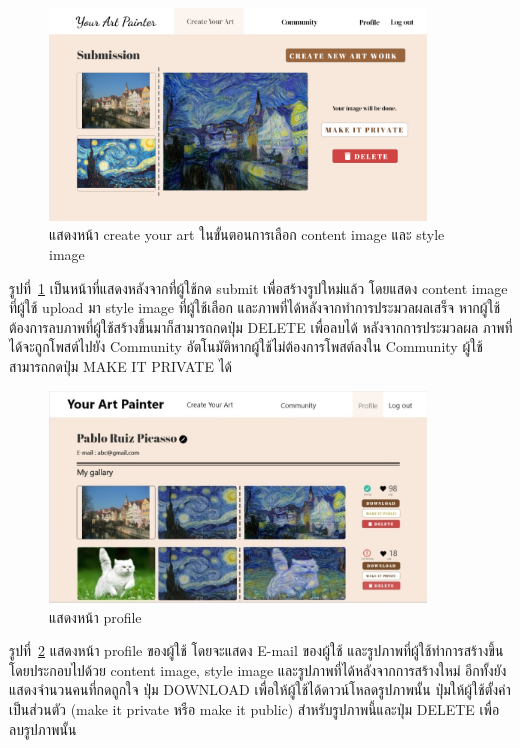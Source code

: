 \documentclass[12pt,oneside,openright,a4paper]{cpe-thai-project}
\begin{document}
\newpage
\begin{figure}[!h]
  \centering
  \includegraphics[width=10cm]{./image/ui-create2.png}
  \caption{แสดงหน้า create your art ในขั้นตอนการเลือก content image และ style image}
  \label{fig:ui-create2}
\end{figure}
\par\setlength{\parindent}{5ex}
รูปที่~\ref{fig:ui-create2} เป็นหน้าที่แสดงหลังจากที่ผู้ใช้กด submit เพื่อสร้างรูปใหม่แล้ว โดยแสดง content image ที่ผู้ใช้ upload มา style image ที่ผู้ใช้เลือก และภาพที่ได้หลังจากทำการประมวลผลเสร็จ หากผู้ใช้ต้องการลบภาพที่ผู้ใช้สร้างขึ้นมาก็สามารถกดปุ่ม DELETE เพื่อลบได้ หลังจากการประมวลผล ภาพที่ได้จะถูกโพสต์ไปยัง Community อัตโนมัติหากผู้ใช้ไม่ต้องการโพสต์ลงใน Community ผู้ใช้สามารถกดปุ่ม MAKE IT PRIVATE ได้

\begin{figure}[!h]
  \centering
  \includegraphics[width=10cm]{./image/ui-profile.jpg}
  \caption{แสดงหน้า profile}
  \label{fig:ui-profile}
\end{figure}

\par\setlength{\parindent}{5ex}
รูปที่~\ref{fig:ui-profile} แสดงหน้า profile ของผู้ใช้ โดยจะแสดง E-mail ของผู้ใช้ และรูปภาพที่ผู้ใช้ทำการสร้างขึ้น โดยประกอบไปด้วย content image, style image และรูปภาพที่ได้หลังจากการสร้างใหม่ อีกทั้งยังแสดงจำนวนคนที่กดถูกใจ ปุ่ม DOWNLOAD เพื่อให้ผู้ใช้ได้ดาวน์โหลดรูปภาพนั้น ปุ่มให้ผู้ใช้ตั้งค่าเป็นส่วนตัว (make it private หรือ make it public) สำหรับรูปภาพนี้และปุ่ม DELETE เพื่อลบรูปภาพนั้น
\end{document}
